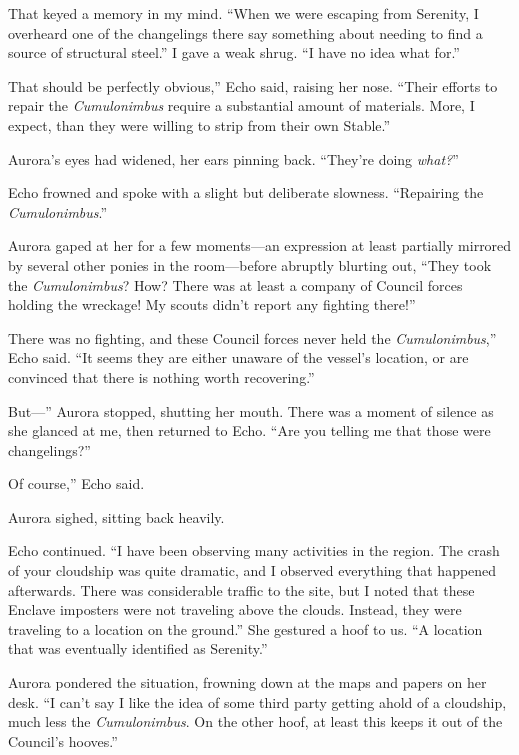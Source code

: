 That keyed a memory in my mind. “When we were escaping from Serenity, I overheard one of the changelings there say something about needing to find a source of structural steel.” I gave a weak shrug. “I have no idea what for.”

\leavevmode{}That should be perfectly obvious,” Echo said, raising her nose. “Their efforts to repair the \textit{Cumulonimbus} require a substantial amount of materials. More, I expect, than they were willing to strip from their own Stable.”

Aurora’s eyes had widened, her ears pinning back. “They’re doing \textit{what?}”

Echo frowned and spoke with a slight but deliberate slowness. “Repairing the \textit{Cumulonimbus}.”

Aurora gaped at her for a few moments—an expression at least partially mirrored by several other ponies in the room—before abruptly blurting out, “They took the \textit{Cumulonimbus}? How? There was at least a company of Council forces holding the wreckage! My scouts didn’t report any fighting there!”

\leavevmode{}There was no fighting, and these Council forces never held the \textit{Cumulonimbus},” Echo said. “It seems they are either unaware of the vessel’s location, or are convinced that there is nothing worth recovering.”

\leavevmode{}But—” Aurora stopped, shutting her mouth. There was a moment of silence as she glanced at me, then returned to Echo. “Are you telling me that those were changelings?”

\leavevmode{}Of course,” Echo said.

Aurora sighed, sitting back heavily.

Echo continued. “I have been observing many activities in the region. The crash of your cloudship was quite dramatic, and I observed everything that happened afterwards. There was considerable traffic to the site, but I noted that these Enclave imposters were not traveling above the clouds. Instead, they were traveling to a location on the ground.” She gestured a hoof to us. “A location that was eventually identified as Serenity.”

Aurora pondered the situation, frowning down at the maps and papers on her desk. “I can’t say I like the idea of some third party getting ahold of a cloudship, much less the \textit{Cumulonimbus}. On the other hoof, at least this keeps it out of the Council’s hooves.”

